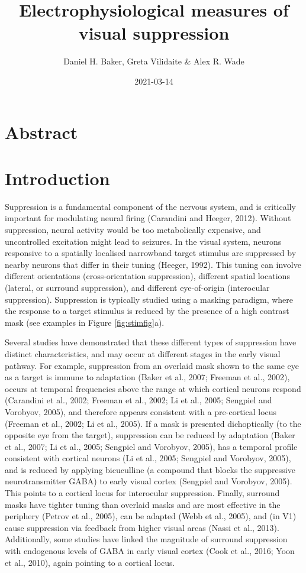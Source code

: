 \documentclass[]{article}
\title{Electrophysiological measures of visual suppression}
\author{Daniel H. Baker, Greta Vilidaite \& Alex R. Wade}
\date{2021-03-14}
\begin{document}
\maketitle

\hypertarget{abstract}{%
\section{Abstract}\label{abstract}}

\hypertarget{introduction}{%
\section{Introduction}\label{introduction}}

Suppression is a fundamental component of the nervous system, and is critically important for modulating neural firing (Carandini and Heeger, 2012). Without suppression, neural activity would be too metabolically expensive, and uncontrolled excitation might lead to seizures. In the visual system, neurons responsive to a spatially localised narrowband target stimulus are suppressed by nearby neurons that differ in their tuning (Heeger, 1992). This tuning can involve different orientations (cross-orientation suppression), different spatial locations (lateral, or surround suppression), and different eye-of-origin (interocular suppression). Suppression is typically studied using a masking paradigm, where the response to a target stimulus is reduced by the presence of a high contrast mask (see examples in Figure \ref{fig:stimfig}a).

Several studies have demonstrated that these different types of suppression have distinct characteristics, and may occur at different stages in the early visual pathway. For example, suppression from an overlaid mask shown to the same eye as a target is immune to adaptation (Baker et al., 2007; Freeman et al., 2002), occurs at temporal frequencies above the range at which cortical neurons respond (Carandini et al., 2002; Freeman et al., 2002; Li et al., 2005; Sengpiel and Vorobyov, 2005), and therefore appears consistent with a pre-cortical locus (Freeman et al., 2002; Li et al., 2005). If a mask is presented dichoptically (to the opposite eye from the target), suppression can be reduced by adaptation (Baker et al., 2007; Li et al., 2005; Sengpiel and Vorobyov, 2005), has a temporal profile consistent with cortical neurons (Li et al., 2005; Sengpiel and Vorobyov, 2005), and is reduced by applying bicuculline (a compound that blocks the suppressive neurotransmitter GABA) to early visual cortex (Sengpiel and Vorobyov, 2005). This points to a cortical locus for interocular suppression. Finally, surround masks have tighter tuning than overlaid masks and are most effective in the periphery (Petrov et al., 2005), can be adapted (Webb et al., 2005), and (in V1) cause suppression via feedback from higher visual areas (Nassi et al., 2013). Additionally, some studies have linked the magnitude of surround suppression with endogenous levels of GABA in early visual cortex (Cook et al., 2016; Yoon et al., 2010), again pointing to a cortical locus.
\end{document}
